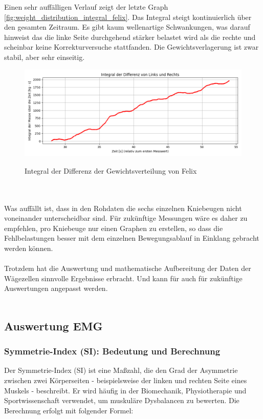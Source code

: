 Einen sehr auffälligen Verlauf zeigt der letzte Graph \autoref{fig:weight_distribution_integral_felix}. 
Das Integral steigt kontinuierlich über den gesamten Zeitraum. 
Es gibt kaum wellenartige Schwankungen, was darauf hinweist das die linke Seite durchgehend stärker belastet wird als die rechte und scheinbar keine Korrekturversuche stattfanden. 
Die Gewichtsverlagerung ist zwar stabil, aber sehr einseitig. 
\begin{figure}
  \centering
  \includegraphics[width=0.7\linewidth]{img/pyplots/Integral der Differenz - Felix.png}\\
  \caption{Integral der Differenz der Gewichtsverteilung von Felix}
  \label{fig:weight_distribution_integral_felix}
\end{figure}
\\
\\
Was auffällt ist, dass in den Rohdaten die sechs einzelnen Kniebeugen nicht voneinander unterscheidbar sind. 
Für zukünftige Messungen wäre es daher zu empfehlen, pro Kniebeuge nur einen Graphen zu erstellen, so dass die Fehlbelastungen besser mit dem einzelnen Bewegungsablauf in Einklang gebracht werden können.\\
\\
Trotzdem hat die Auswertung und mathematische Aufbereitung der Daten der Wägezellen sinnvolle Ergebnisse erbracht. Und kann für auch für zukünftige Auswertungen angepasst werden. \\
\\
\subsection{Auswertung EMG}
\subsubsection{Symmetrie-Index (SI): Bedeutung und Berechnung}

Der Symmetrie-Index (SI) ist eine Maßzahl, die den Grad der Asymmetrie zwischen zwei Körperseiten - beispielsweise der linken und rechten Seite eines Muskels - beschreibt. Er wird häufig in der Biomechanik, Physiotherapie und Sportwissenschaft verwendet, um muskuläre Dysbalancen zu bewerten.
Die Berechnung erfolgt mit folgender Formel:

